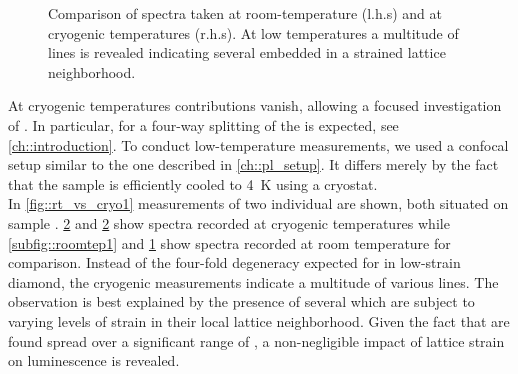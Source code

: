 \begin{figure}[htp]
\begin{subfigure}[t]{ 0.49\linewidth}
					\label{subfig::roomtep2}
				\end{subfigure}
				\hfill
				\begin{subfigure}[t]{ 0.49\linewidth}
					\centering
					\caption{}
					\label{subfig::cryo2}
				\end{subfigure}
				\caption[Spectra of \nds at cryogenic temperatures]{Comparison of spectra taken at room-temperature (l.h.s) and at cryogenic temperatures (r.h.s). At low temperatures a multitude of lines is revealed indicating several \sivs embedded in a strained lattice neighborhood.}
				\label{fig::rt_vs_cryo}
			\end{figure}

			At cryogenic temperatures \psb contributions vanish, allowing a focused investigation of \zpls. 
			In particular, for \sivs a four-way splitting of the \zpl is expected, see \cref{ch::introduction}. 
			To conduct low-temperature measurements, we used a confocal setup similar to the one described in \cref{ch::pl_setup}. 
			It differs merely by the fact that the sample is efficiently cooled to \SI{4}{\kelvin} using a cryostat.
			\\
			In \cref{fig::rt_vs_cryo1} measurements of two individual \nds are shown, both situated on sample \insituSo.
			\cref{subfig::cryo2} and \cref{subfig::cryo2} show spectra recorded at cryogenic temperatures while \cref{subfig::roomtep1} and \cref{subfig::roomtep2} show spectra recorded at room temperature for comparison. 
			Instead of the four-fold degeneracy expected for \sivs in low-strain diamond, the cryogenic measurements indicate a multitude of various lines. 
			The observation is best explained by the presence of several \sivs which are subject to varying levels of strain in their local lattice neighborhood. 
			Given the fact that \zpls are found spread over a significant range of \wls, a non-negligible impact of lattice strain on \siv luminescence is revealed.

			